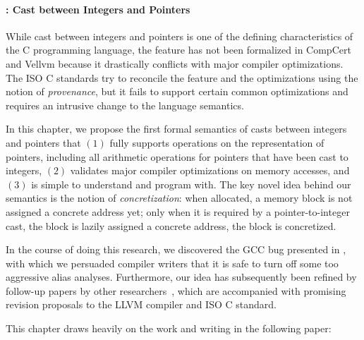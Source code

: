 \paragraph{: Cast between Integers and Pointers}

While cast between integers and pointers is one of the defining characteristics of the C programming
language, the feature has not been formalized in CompCert and Vellvm because it drastically
conflicts with major compiler optimizations.  The ISO C standards try to reconcile the feature and
the optimizations using the notion of \emph{provenance}, but it fails to support certain common
optimizations and requires an intrusive change to the language semantics.

In this chapter, we propose the first formal semantics of casts between integers and pointers that
$(1)$ fully supports operations on the representation of pointers, including all arithmetic
operations for pointers that have been cast to integers, $(2)$ validates major compiler
optimizations on memory accesses, and $(3)$ is simple to understand and program with.  The key novel
idea behind our semantics is the notion of \emph{concretization}: when allocated, a memory block is
not assigned a concrete address yet; only when it is required by a pointer-to-integer cast, the
block is lazily assigned a concrete address, \ie{} the block is concretized.

In the course of doing this research, we discovered the GCC bug presented in
, with which we persuaded compiler writers that it is safe to turn off
some too aggressive alias analyses.  Furthermore, our idea has subsequently been refined by
follow-up papers by other researchers~\cite{intptrcast-oopsla,intptrcast-popl}, which are
accompanied with promising revision proposals to the LLVM compiler and ISO C standard.



This chapter draws heavily on the work and writing in the following paper:

